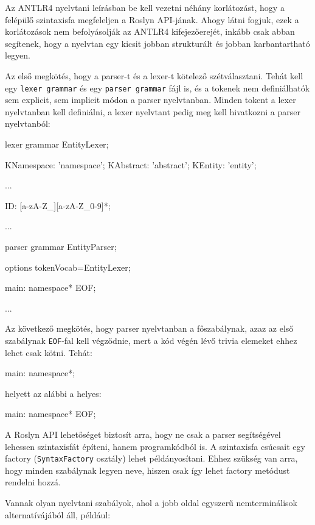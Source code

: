 \documentclass[12pt, a4paper]{report}
\newcommand{\f}[1]{\texttt{#1}}
\begin{document}
Az ANTLR4 nyelvtani leírásban be kell vezetni néhány korlátozást, hogy a felépülő szintaxisfa megfeleljen a Roslyn API-jának. Ahogy látni fogjuk, ezek a korlátozások nem befolyásolják az ANTLR4 kifejezőerejét, inkább csak abban segítenek, hogy a nyelvtan egy kicsit jobban strukturált és jobban karbantartható legyen.

Az első megkötés, hogy a parser-t és a lexer-t kötelező szétválasztani. Tehát kell egy \f{lexer grammar} és egy \f{parser grammar} fájl is, és a tokenek nem definiálhatók sem explicit, sem implicit módon a parser nyelvtanban. Minden tokent a lexer nyelvtanban kell definiálni, a lexer nyelvtant pedig meg kell hivatkozni a parser nyelvtanból:

\begin{antlr4code}
lexer grammar EntityLexer;

KNamespace: 'namespace';
KAbstract: 'abstract';
KEntity: 'entity';

...

ID: [a-zA-Z_][a-zA-Z_0-9]*;

...
\end{antlr4code}

\begin{antlr4code}
parser grammar EntityParser;

options 
{ 
	tokenVocab=EntityLexer;
}

main: namespace* EOF;

...
\end{antlr4code}

Az következő megkötés, hogy parser nyelvtanban a főszabálynak, azaz az első szabálynak \f{EOF}-fal kell végződnie, mert a kód végén lévő trivia elemeket ehhez lehet csak kötni. Tehát:

\begin{antlr4code}
main: namespace*;
\end{antlr4code}

helyett az alábbi a helyes:

\begin{antlr4code}
main: namespace* EOF;
\end{antlr4code}

A Roslyn API lehetőséget biztosít arra, hogy ne csak a parser segítségével lehessen szintaxisfát építeni, hanem programkódból is. A szintaxisfa csúcsait egy factory (\f{SyntaxFactory} osztály) lehet példányosítani. Ehhez szükség van arra, hogy minden szabálynak legyen neve, hiszen csak így lehet factory metódust rendelni hozzá.

Vannak olyan nyelvtani szabályok, ahol a jobb oldal egyszerű nemterminálisok alternatívájából áll, például:
\end{document}
